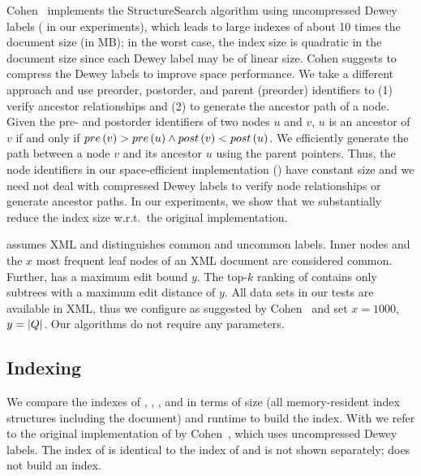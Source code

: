 Cohen~\cite{cohen-sigmod-2013} implements the StructureSearch algorithm using uncompressed Dewey labels (\structureplainshort{} in our experiments), which leads to large indexes of about 10 times the document size (in MB); in the worst case, the index size is quadratic in the document size since each Dewey label may be of linear size. Cohen suggests to compress the Dewey labels to improve space performance. We take a different approach and use preorder, postorder, and parent (preorder) identifiers to (1) verify ancestor relationships and (2) to generate the ancestor path of a node. Given the pre- and postorder identifiers of two nodes $u$ and $v$, $u$ is an ancestor of $v$ if and only if $pre \left( v \right) > pre \left( u \right) \land post \left( v \right) < post \left( u \right)$. We efficiently generate the path between a node $v$ and its ancestor $u$ using the parent pointers. Thus, the node identifiers in our space-efficient implementation (\structuresearchshort) have constant size and we need not deal with compressed Dewey labels to verify node relationships or generate ancestor paths. In our experiments, we show that we substantially reduce the index size w.r.t.\ the original implementation.

\structuresearchshort{} assumes XML and distinguishes common and uncommon labels. Inner nodes and the $x$ most frequent leaf nodes of an XML document are considered common. Further, \structuresearchshort{} has a maximum edit bound $y$. The top-$k$ ranking of \structuresearchshort{} contains only subtrees with a maximum edit distance of $y$. All data sets in our tests are available in XML, thus we configure \structuresearchshort{} as suggested by Cohen~\cite{cohen-sigmod-2013} and set $x = 1000$, $y = \left| Q \right|$. Our algorithms do not require any parameters.

\subsection{Indexing}
\label{subsec:empirical-evaluation-indexing}

We compare the indexes of \structuresearchshort{}, \coneshort{},
\shinconeshort{}, and \shinconedynshort{} in terms of size (all memory-resident index structures including the document) and runtime to build the index. With \structureplainshort{} we refer to the original implementation of \structuresearchshort{} by Cohen~\cite{cohen-sigmod-2013}, which uses uncompressed Dewey labels. The index of \lowerboundmergeshort{} is identical to the index of \coneshort{} and is not shown separately; \tasmpostordershort{} does not build an index.

